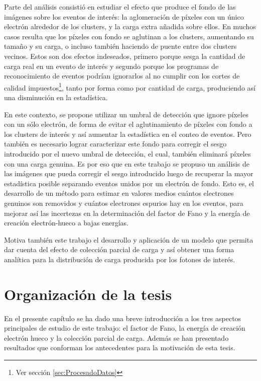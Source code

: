 Parte del análisis consistió en estudiar el efecto que produce el fondo de las imágenes sobre los eventos de interés: la aglomeración de píxeles con un único electrón alrededor de los clusters, y la carga extra añadida sobre ellos. 
En muchos casos resulta que los píxeles con fondo se aglutinan a los clusters, aumentando su tamaño y su carga, o incluso también haciendo de puente entre dos clusters vecinos. Estos son dos efectos indeseados, primero porque sesga la cantidad de carga real en un evento de interés y segundo porque los programas de reconocimiento de eventos podrían ignorarlos al no cumplir con los cortes de calidad impuestos\footnote{Ver sección \ref{sec:ProcesadoDatos}}, tanto por forma como por cantidad de carga, produciendo así una disminución en la estadística.

En este contexto, se propone utilizar un umbral de detección que ignore píxeles con un sólo electrón, de forma de evitar el aglutinamiento de píxeles con fondo a los clusters de interés y así aumentar la estadística en el conteo de eventos. 
Pero también es necesario lograr caracterizar este fondo para corregir el sesgo introducido por el nuevo umbral de detección, el cual, también eliminará píxeles con una carga genuina. 
Es por eso que en este trabajo se propuso un análisis de las imágenes que pueda corregir el sesgo introducido luego de recuperar la mayor estadística posible separando eventos unidos por un electrón de fondo. 
Esto es, el desarrollo de un método para estimar en valores medios cuántos electrones genuinos son removidos y cuántos electrones espurios hay en los eventos, para mejorar así las incertezas en la determinación del factor de Fano y la energía de creación electrón-hueco a bajas energías.

Motiva también este trabajo el desarrollo y aplicación de un modelo que permita dar cuenta del efecto de colección parcial de carga y así obtener una forma analítica para la distribución de carga producida por los fotones de interés.

\section{Organización de la tesis}
\noindent En el presente capítulo se ha dado una breve introducción a los tres aspectos principales de estudio de este trabajo: el factor de Fano, la energía de creación electrón hueco y la colección parcial de carga. Además se han presentado resultados que conforman los antecedentes para la motivación de esta tesis.

